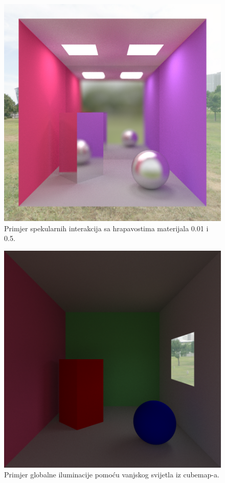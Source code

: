 \documentclass[
12pt, %
oneside, %
english, %
singlespacing, %
parskip, %
headsepline, %
chapterinoneline, %
consistentlayout, %
]{MastersDoctoralThesis} %
\begin{document}
\begin{figure}[h]
	\caption{Primjer spekularnih interakcija sa hrapavostima materijala 0.01 i 0.5.}
	\centering
	\includegraphics[width=\textwidth]{demo2.png}
\end{figure}

\begin{figure}[h]
	\caption{Primjer globalne iluminacije pomoću vanjskog svijetla iz cubemap-a.}
	\centering
	\includegraphics[width=\textwidth]{demo3.png}
\end{figure}
\end{document}
